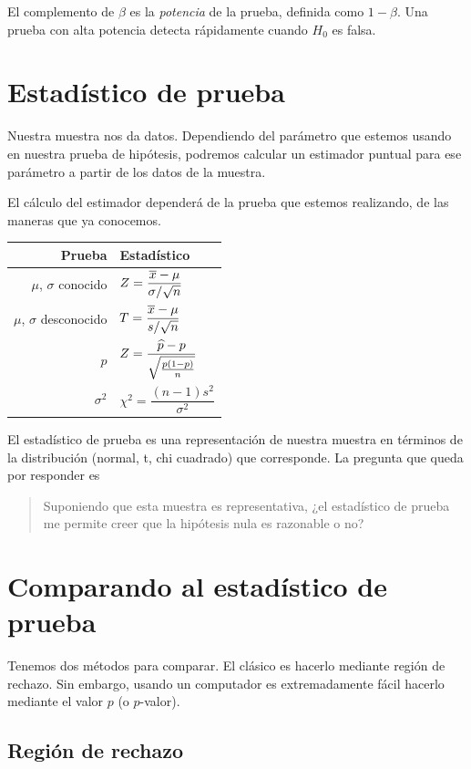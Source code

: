 El complemento de \(\beta\) es la \emph{potencia} de la prueba, definida como \(1-\beta\). Una prueba con alta potencia detecta rápidamente cuando \(H_0\) es falsa.

\section{Estadístico de prueba}

Nuestra muestra nos da datos. Dependiendo del parámetro que estemos usando en nuestra prueba de hipótesis, podremos calcular un estimador puntual para ese parámetro a partir de los datos de la muestra. 

El cálculo del estimador dependerá de la prueba que estemos realizando, de las maneras que ya conocemos. 
\begin{center}
{
\renewcommand{\arraystretch}{3}
\begin{tabular}{rl}
Prueba & Estadístico\\\midrule
\(\mu\), \(\sigma\) conocido & \(Z = \dfrac{\overline{x} - \mu}{\sigma/\sqrt{n}}\)\\
\(\mu\), \(\sigma\) desconocido & \(T = \dfrac{\overline{x} - \mu}{s/\sqrt{n}}\)\\
\(p\) & \(Z = \dfrac{\widehat{p} - p}{\sqrt{\frac{p(1-p)}{n}}}\)\\
\(\sigma^2\) & \(\chi^2 = \dfrac{(n-1)s^2}{\sigma^2}\)
\end{tabular}
}
\end{center}

El estadístico de prueba es una representación de nuestra muestra en términos de la distribución (normal, t, chi cuadrado) que corresponde. La pregunta que queda por responder es
\begin{quotation}
Suponiendo que esta muestra es representativa, ¿el estadístico de prueba me permite creer que la hipótesis nula es razonable o no?
\end{quotation}

\section{Comparando al estadístico de prueba}

Tenemos dos métodos para comparar. El clásico es hacerlo mediante región de rechazo. Sin embargo, usando un computador es extremadamente fácil hacerlo mediante el valor \(p\) (o \(p\)-valor).

\subsection{Región de rechazo}

